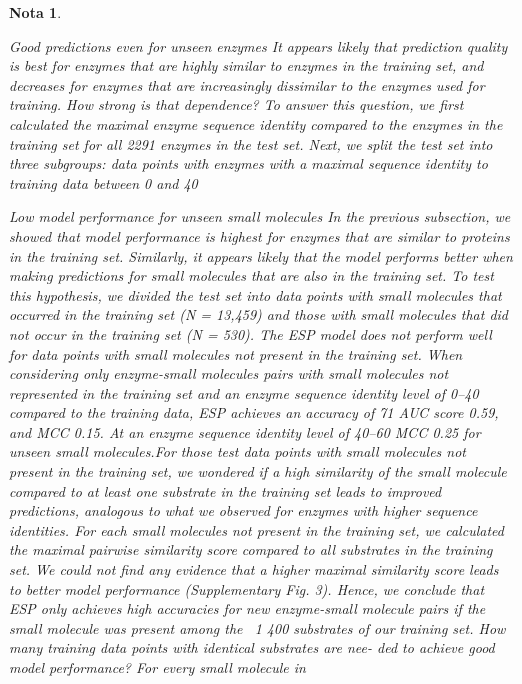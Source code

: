 \documentclass[12pt]{article}
\newtheorem{Note}{Nota}%
\begin{document}
\begin{Note}
\begin{itemize}
Good predictions even for unseen enzymes
It appears likely that prediction quality is best for enzymes that are
highly similar to enzymes in the training set, and decreases for
enzymes that are increasingly dissimilar to the enzymes used for
training. How strong is that dependence? To answer this question, we
ﬁrst calculated the maximal enzyme sequence identity compared to
the enzymes in the training set for all 2291 enzymes in the test set.
Next, we split the test set into three subgroups: data points with
enzymes with a maximal sequence identity to training data between 0
and 40%

Low model performance for unseen small molecules
In the previous subsection, we showed that model performance is
highest for enzymes that are similar to proteins in the training set.
Similarly, it appears likely that the model performs better when making
predictions for small molecules that are also in the training set. To test
this hypothesis, we divided the test set into data points with small
molecules that occurred in the training set (N = 13,459) and those with
small molecules that did not occur in the training set (N = 530).
The ESP model does not perform well for data points with small
molecules not present in the training set. When considering only
enzyme-small molecules pairs with small molecules not represented in
the training set and an enzyme sequence identity level of 0–40%
compared to the training data, ESP achieves an accuracy of 71%
AUC score 0.59, and MCC 0.15. At an enzyme sequence identity level of
40–60%
MCC 0.25 for unseen small molecules.For those test data points with small molecules not present in the
training set, we wondered if a high similarity of the small molecule
compared to at least one substrate in the training set leads to
improved predictions, analogous to what we observed for enzymes
with higher sequence identities. For each small molecules not present
in the training set, we calculated the maximal pairwise similarity score
compared to all substrates in the training set. We could not ﬁnd any
evidence that a higher maximal similarity score leads to better model
performance (Supplementary Fig. 3). Hence, we conclude that ESP only
achieves high accuracies for new enzyme-small molecule pairs if the
small molecule was present among the ~1 400 substrates of our
training set.
How many training data points with identical substrates are nee-
ded to achieve good model performance? For every small molecule in

\end{itemize}
\end{Note}
\end{document}
